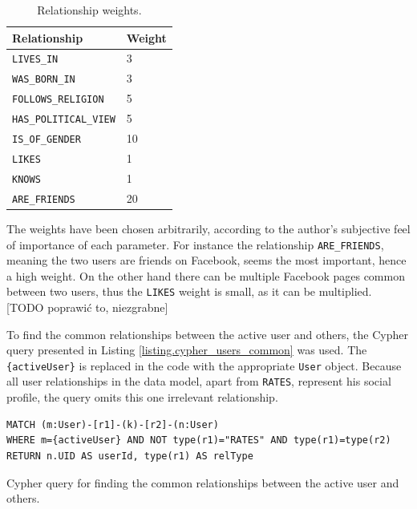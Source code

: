 \documentclass[12pt]{report}
\begin{document}
\begin{table}[!h]
\centering
\caption{Relationship weights.}
\label{table.weights}
\vspace{3mm}
\begin{tabular}{ll}
\hline
Relationship         & Weight \vspace{2mm} \\ \hline
\texttt{LIVES\_IN}            & 3      \\ 
\texttt{WAS\_BORN\_IN}        & 3      \\
\texttt{FOLLOWS\_RELIGION}    & 5      \\
\texttt{HAS\_POLITICAL\_VIEW} & 5      \\
\texttt{IS\_OF\_GENDER}       & 10     \\
\texttt{LIKES}                & 1      \\
\texttt{KNOWS}                & 1      \vspace{2mm} \\
\texttt{ARE\_FRIENDS}         & 20     \vspace{2mm} \\ \hline
\end{tabular}
\end{table}

The weights have been chosen arbitrarily, according to the author's subjective feel of importance of each parameter. For instance the relationship \texttt{ARE\_FRIENDS}, meaning the two users are friends on Facebook, seems the most important, hence a high weight. On the other hand there can be multiple Facebook pages common between two users, thus the \texttt{LIKES} weight is small, as it can be multiplied. [TODO poprawić to, niezgrabne]

To find the common relationships between the active user and others, the Cypher query presented in Listing \ref{listing.cypher_users_common} was used. The \texttt{\{active\-User\}} is replaced in the code with the appropriate \texttt{User} object. Because all user relationships in the data model, apart from \texttt{RATES}, represent his social profile, the query omits this one irrelevant relationship.

\begin{listing}
\begin{verbatim}
MATCH (m:User)-[r1]-(k)-[r2]-(n:User)
WHERE m={activeUser} AND NOT type(r1)="RATES" AND type(r1)=type(r2) 
RETURN n.UID AS userId, type(r1) AS relType
\end{verbatim}
\caption{Cypher query for finding the common relationships between the active user and others.}
\label{listing.cypher_users_common}
\end{listing}
\end{document}
